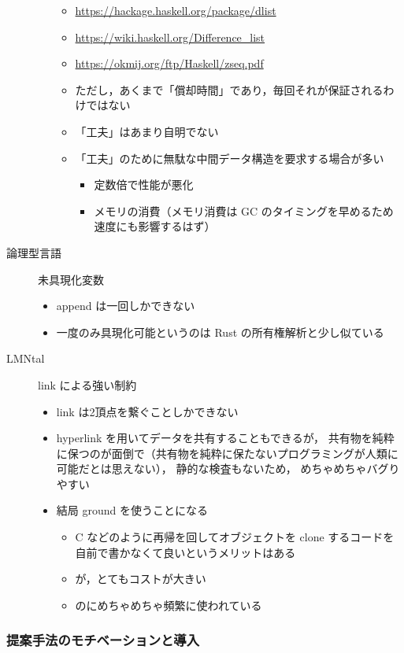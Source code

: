 \documentclass[10pt, a4j, twocolumn]{scrartcl}
\begin{document}
\begin{description}
\begin{itemize}
\begin{itemize}
\item \url{https://hackage.haskell.org/package/dlist}
\item \url{https://wiki.haskell.org/Difference\_list}
\item \url{https://okmij.org/ftp/Haskell/zseq.pdf}
\item ただし，あくまで「償却時間」であり，毎回それが保証されるわけではない
\item 「工夫」はあまり自明でない
\item 「工夫」のために無駄な中間データ構造を要求する場合が多い
\begin{itemize}
\item 定数倍で性能が悪化
\item メモリの消費（メモリ消費は GC のタイミングを早めるため速度にも影響するはず）
\end{itemize}
\end{itemize}
\end{itemize}
\item[{論理型言語}] 未具現化変数
\begin{itemize}
\item append は一回しかできない
\item 一度のみ具現化可能というのは Rust の所有権解析と少し似ている
\end{itemize}
\item[{LMNtal}] link による強い制約
\begin{itemize}
\item link は2頂点を繋ぐことしかできない
\item hyperlink を用いてデータを共有することもできるが，
共有物を純粋に保つのが面倒で（共有物を純粋に保たないプログラミングが人類に可能だとは思えない），
静的な検査もないため，
めちゃめちゃバグりやすい
\item 結局 ground を使うことになる
\begin{itemize}
\item C などのように再帰を回してオブジェクトを clone するコードを自前で書かなくて良いというメリットはある
\item が，とてもコストが大きい
\item のにめちゃめちゃ頻繁に使われている
\end{itemize}
\end{itemize}
\end{description}


\subsubsection{提案手法のモチベーションと導入}
\label{sec:orgab386f5}
\end{document}

